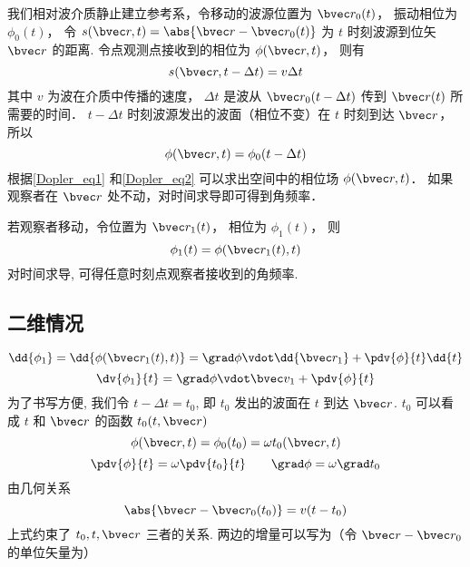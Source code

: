 

我们相对波介质静止建立参考系，令移动的波源位置为 $\bvec r_0(t)$， 振动相位为 $\phi_0(t)$， 令 $s(\bvec r, t) = \abs{\bvec r - \bvec r_0(t)}$ 为 $t$ 时刻波源到位矢 $\bvec r$ 的距离. 令点观测点接收到的相位为 $\phi(\bvec r, t)$， 则有
\begin{equation}\label{Dopler_eq1}
s(\bvec r, t - \Delta t) = v\Delta t
\end{equation}
其中 $v$ 为波在介质中传播的速度， $\Delta t$ 是波从 $\bvec r_0(t - \Delta t)$ 传到 $\bvec r(t)$ 所需要的时间． $t - \Delta t$ 时刻波源发出的波面（相位不变）在 $t$ 时刻到达 $\bvec r$， 所以
\begin{equation}\label{Dopler_eq2}
\phi(\bvec r, t) = \phi_0(t - \Delta t)
\end{equation}
根据\autoref{Dopler_eq1} 和\autoref{Dopler_eq2} 可以求出空间中的相位场 $\phi(\bvec r, t)$． 如果观察者在 $\bvec r$ 处不动，对时间求导即可得到角频率．

若观察者移动，令位置为 $\bvec r_1(t)$， 相位为 $\phi_1(t)$， 则
\begin{equation}
\phi_1(t) = \phi(\bvec r_1(t), t)
\end{equation}
对时间求导, 可得任意时刻点观察者接收到的角频率.


\subsection{二维情况}
\begin{equation}
\dd{\phi_1} = \dd{\phi(\bvec r_1(t), t)} = \grad \phi \vdot \dd{\bvec r_1} + \pdv{\phi}{t}\dd{t}
\end{equation}
\begin{equation}
\dv{\phi_1}{t} = \grad\phi \vdot \bvec v_1 + \pdv{\phi}{t}
\end{equation}
为了书写方便, 我们令 $t - \Delta t = t_0$, 即 $t_0$ 发出的波面在 $t$ 到达 $\bvec r$. $t_0$ 可以看成 $t$ 和 $\bvec r$ 的函数  $t_0(t, \bvec r)$
\begin{equation}
\phi(\bvec r, t) =  \phi_0(t_0) = \omega t_0(\bvec r, t)
\end{equation}
\begin{equation}
\pdv{\phi}{t} = \omega \pdv{t_0}{t} \qquad
\grad \phi = \omega \grad t_0
\end{equation}
由几何关系
\begin{equation}
\abs{\bvec r - \bvec r_0(t_0)} = v(t - t_0)
\end{equation}
上式约束了 $t_0, t, \bvec r$ 三者的关系. 两边的增量可以写为（令 $\bvec r - \bvec r_0$ 的单位矢量为）
